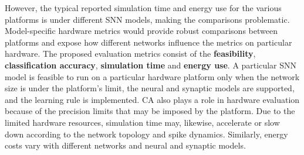 \documentclass{frontiersENG} %
\newenvironment{mycell}[1]
{
	\begin{minipage}{#1}
		\begin{center}
			\vspace*{0.15cm}
		}
		{
			\vspace*{0.1cm}
		\end{center}
	\end{minipage}
}
\newenvironment{leftcell}[1]
{
	\begin{minipage}{#1}
		\begin{flushleft}
			\vspace*{0.15cm}
		}
		{
			\vspace*{0.1cm}
		\end{flushleft}
	\end{minipage}
}
\begin{document}
However, the typical reported simulation time and energy use for the various platforms is under different SNN models, making the comparisons problematic.
Model-specific hardware metrics would provide robust comparisons between platforms and expose how different networks influence the metrics on particular hardware.
The proposed evaluation metrics consist of the \textbf{feasibility}, \textbf{classification accuracy}, \textbf{simulation time} and \textbf{energy use}.
A particular SNN model is feasible to run on a particular hardware platform only when the network size is under the platform's limit, the neural and synaptic models are supported, and the learning rule is implemented.
CA also plays a role in hardware evaluation because of the precision limits that may be imposed by the platform.
Due to the limited hardware resources, simulation time may, likewise, accelerate or slow down according to the network topology and spike dynamics.
Similarly, energy costs vary with different networks and neural and synaptic models.
\end{document}
